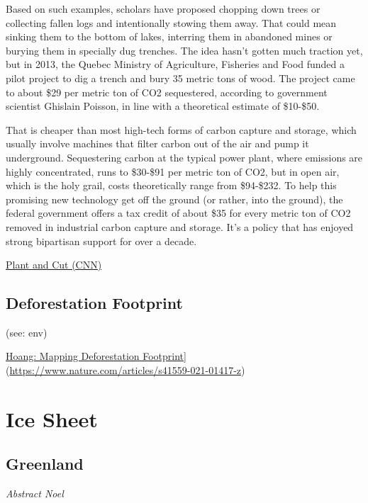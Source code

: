 \documentclass[
]{book}
\begin{document}
Based on such examples, scholars have proposed chopping down trees or collecting fallen logs and intentionally stowing them away. That could mean sinking them to the bottom of lakes, interring them in abandoned mines or burying them in specially dug trenches.
The idea hasn't gotten much traction yet, but in 2013, the Quebec Ministry of Agriculture, Fisheries and Food funded a pilot project to dig a trench and bury 35 metric tons of wood. The project came to about \$29 per metric ton of CO2 sequestered, according to government scientist Ghislain Poisson, in line with a theoretical estimate of \$10-\$50.

That is cheaper than most high-tech forms of carbon capture and storage, which usually involve machines that filter carbon out of the air and pump it underground. Sequestering carbon at the typical power plant, where emissions are highly concentrated, runs to \$30-\$91 per metric ton of CO2, but in open air, which is the holy grail, costs theoretically range from \$94-\$232. To help this promising new technology get off the ground (or rather, into the ground), the federal government offers a tax credit of about \$35 for every metric ton of CO2 removed in industrial carbon capture and storage. It's a policy that has enjoyed strong bipartisan support for over a decade.

\href{https://edition.cnn.com/2021/02/10/opinions/climate-plant-and-cut-trees-down-bader/index.html}{Plant and Cut (CNN)}

\hypertarget{deforestation-footprint}{%
\section{Deforestation Footprint}\label{deforestation-footprint}}

(see: env)

\href{Nature,\%20paywall}{Hoang: Mapping Deforestation Footprint}{]}(\url{https://www.nature.com/articles/s41559-021-01417-z})

\hypertarget{ice-sheet}{%
\chapter{Ice Sheet}\label{ice-sheet}}

\hypertarget{greenland}{%
\section{Greenland}\label{greenland}}

\emph{Abstract Noel}
\end{document}
